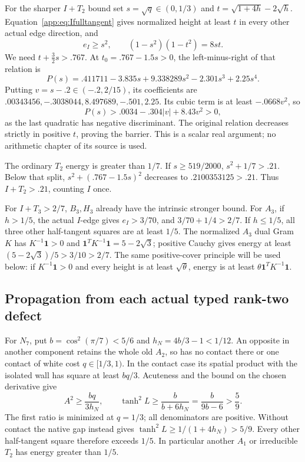 \documentclass[11pt]{article}
\theoremstyle{definition}
\theoremstyle{remark}
\begin{document}
For the sharper \(I+T_2\) bound set \(s=\sqrt q\in(0,1/3)\)
and \(t=\sqrt{1+4h}-2\sqrt h\).
Equation~\eqref{app:eq:Ifulltangent} gives normalized height
at least \(t\) in every other actual edge direction, and
\[
 e_I\geq s^2,\qquad(1-s^2)(1-t^2)=8st.
\]
We need \(t+\tfrac32s>.767\).
At \(t_0=.767-1.5s>0\), the left-minus-right of that relation is
\[
 P(s)=.411711-3.835s+9.338289s^2-2.301s^3+2.25s^4.
\]
Putting \(v=s-.2\in(-.2,2/15)\), its coefficients are
\(.00343456,-.3038044,8.497689,-.501,2.25\).
Its cubic term is at least \(-.0668v^2\), so
\[
 P(s)>.0034-.304|v|+8.43v^2>0,
\]
as the last quadratic has negative discriminant.
The original relation decreases strictly in positive \(t\),
proving the barrier. This is a scalar real argument; no
arithmetic chapter of its source is used.

The ordinary \(T_2\) energy is greater than \(1/7\).
If \(s\geq519/2000\), \(s^2+1/7>.21\).
Below that split, \(s^2+(.767-1.5s)^2\) decreases to
\(.2100353125>.21\). Thus \(I+T_2>.21\), counting \(I\) once.

For \(I+T_3>2/7\), \(B_3,H_3\) already have the intrinsic
stronger bound. For \(A_3\), if \(h>1/5\), the actual
\(I\)-edge gives \(e_I>3/70\), and
\(3/70+1/4>2/7\).
If \(h\leq1/5\), all three other half-tangent squares are
at least \(1/5\). The normalized \(A_3\) dual Gram \(K\)
has \(K^{-1}\mathbf1>0\) and
\(\mathbf1^TK^{-1}\mathbf1=5-2\sqrt3\);
positive Cauchy gives energy at least
\((5-2\sqrt3)/5>3/10>2/7\).
The same positive-cover principle will be used below:
if \(K^{-1}\mathbf1>0\) and every height is at least
\(\sqrt\theta\), energy is at least
\(\theta\mathbf1^TK^{-1}\mathbf1\).

\subsection{Propagation from each actual typed rank-two defect}
\label{app:typedpropagation}
For \(N_7\), put \(b=\cos^2(\pi/7)<5/6\) and
\(h_N=4b/3-1<1/12\).
An opposite in another component retains the whole old
\(A_2\), so has no contact there or one contact of white
cost \(q\in[1/3,1)\).
In the contact case its spatial product with the isolated
wall has square at least \(bq/3\).
Acuteness and the bound on the chosen derivative give
\[
 A^2\geq\frac{bq}{3h_N},\qquad
 \tanh^2L\geq\frac{b}{b+6h_N}
             =\frac{b}{9b-6}>\frac59.
\]
The first ratio is minimized at \(q=1/3\); all denominators
are positive. Without contact the native gap instead gives
\(\tanh^2L\geq1/(1+4h_N)>5/9\).
Every other half-tangent square therefore exceeds \(1/5\).
In particular another \(A_1\) or irreducible \(T_2\) has
energy greater than \(1/5\).
\end{document}
